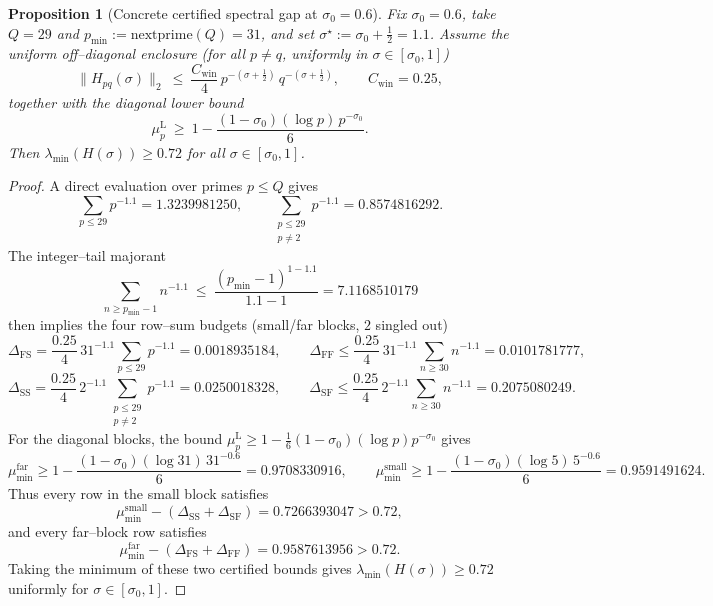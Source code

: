 \documentclass[11pt]{article}
\newtheorem{proposition}[theorem]{Proposition}
\theoremstyle{definition}
\theoremstyle{remark}
\theoremstyle{definition}
\begin{document}
\begin{proposition}[Concrete certified spectral gap at $\sigma_0=0.6$]\label{prop:delta-cert-06}
Fix $\sigma_0=0.6$, take $Q=29$ and $p_{\min}:=\mathrm{nextprime}(Q)=31$, and set $\sigma^\star:=\sigma_0+\tfrac12=1.1$.
Assume the uniform off--diagonal enclosure (for all $p\neq q$, uniformly in $\sigma\in[\sigma_0,1]$)
\[
\|H_{pq}(\sigma)\|_2 \ \le\  \frac{C_{\mathrm{win}}}{4}\, p^{-(\sigma+\tfrac12)}\, q^{-(\sigma+\tfrac12)},
\qquad C_{\mathrm{win}}=0.25,
\]
together with the diagonal lower bound
\[
\mu_p^{\mathrm L}\ \ge\ 1-\frac{(1-\sigma_0)(\log p)\,p^{-\sigma_0}}{6}.
\]
Then $\lambda_{\min}(H(\sigma))\ge 0.72$ for all $\sigma\in[\sigma_0,1]$.
\end{proposition}
\begin{proof}
A direct evaluation over primes $p\le Q$ gives
\[
\sum_{p\le 29} p^{-1.1}=1.3239981250,\qquad \sum_{\substack{p\le 29\\ p\neq 2}} p^{-1.1}=0.8574816292.
\]
The integer--tail majorant
\[
\sum_{n\ge p_{\min}-1} n^{-1.1}\ \le\ \frac{(p_{\min}-1)^{1-1.1}}{1.1-1}=7.1168510179
\]
then implies the four row--sum budgets (small/far blocks, $2$ singled out)
\[
\Delta_{\mathrm{FS}}= \frac{0.25}{4}\,31^{-1.1}\!\!\sum_{p\le 29}p^{-1.1}=0.0018935184,\qquad
\Delta_{\mathrm{FF}}\le \frac{0.25}{4}\,31^{-1.1}\!\!\sum_{n\ge 30}n^{-1.1}=0.0101781777,
\]
\[
\Delta_{\mathrm{SS}}=\frac{0.25}{4}\,2^{-1.1}\!\!\sum_{\substack{p\le 29\\ p\neq 2}}p^{-1.1}=0.0250018328,\qquad
\Delta_{\mathrm{SF}}\le\frac{0.25}{4}\,2^{-1.1}\!\!\sum_{n\ge 30}n^{-1.1}=0.2075080249.
\]
For the diagonal blocks, the bound $\mu_p^{\mathrm L}\ge 1-\tfrac16(1-\sigma_0)(\log p)p^{-\sigma_0}$ gives
\[
\mu_{\min}^{\mathrm{far}}\ge 1-\frac{(1-\sigma_0)(\log 31)\,31^{-0.6}}{6}=0.9708330916,\qquad
\mu_{\min}^{\mathrm{small}}\ge 1-\frac{(1-\sigma_0)(\log 5)\,5^{-0.6}}{6}=0.9591491624.
\]
Thus every row in the small block satisfies
\[
\mu_{\min}^{\mathrm{small}}-(\Delta_{\mathrm{SS}}+\Delta_{\mathrm{SF}})=0.7266393047>0.72,
\]
and every far--block row satisfies
\[
\mu_{\min}^{\mathrm{far}}-(\Delta_{\mathrm{FS}}+\Delta_{\mathrm{FF}})=0.9587613956>0.72.
\]
Taking the minimum of these two certified bounds gives $\lambda_{\min}(H(\sigma))\ge 0.72$ uniformly for $\sigma\in[\sigma_0,1]$.
\end{proof}
\end{document}
